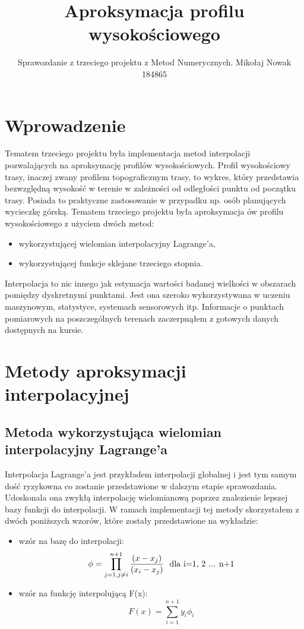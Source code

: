\documentclass{article}
\title{\huge Aproksymacja profilu wysokościowego}
\author{Sprawozdanie z trzeciego projektu z Metod Numerycznych. Mikołaj Nowak 184865}
\date{}
\begin{document}
\maketitle


\section{Wprowadzenie}

Tematem trzeciego projektu była implementacja metod interpolacji pozwalających na aproksymację profilów wysokościowych.
Profil wysokościowy trasy, inaczej zwany profilem topograficznym trasy, to wykres, który przedstawia bezwzględną wysokość w terenie w zależności od odległości punktu od początku trasy. Posiada to praktyczne zastosowanie w przypadku np. osób planujących wycieczkę górską.
Tematem trzeciego projektu była aproksymacja ów profilu wysokościowego z użyciem dwóch metod:
\begin{itemize}
  \item wykorzystującej wielomian interpolacyjny Lagrange'a,
  \item wykorzystującej funkcje sklejane trzeciego stopnia.
\end{itemize}
Interpolacja to nic innego jak estymacja wartości badanej wielkości w obszarach pomiędzy dyskretnymi punktami.
Jest ona szeroko wykorzystywana w uczeniu maszynowym, statystyce, systemach sensorowych itp.
Informacje o punktach pomiarowych na poszczególnych terenach zaczerpnąłem z gotowych danych dostępnych na kursie.

\section{Metody aproksymacji interpolacyjnej}

\subsection{Metoda wykorzystująca wielomian interpolacyjny Lagrange'a}
Interpolacja Lagrange'a jest przykładem interpolacji globalnej i jest tym samym dość ryzykowna co zostanie przedstawione w dalszym
etapie sprawozdania. Udoskonala ona zwykłą interpolację wielomianową poprzez znalezienie lepszej bazy funkcji do interpolacji.
W ramach implementacji tej metody skorzystałem z dwóch poniższych wzorów, które zostały przedstawione na wykładzie:
\begin{itemize}
    \item wzór na bazę do interpolacji:
    \begin{equation}
    \phi = \prod_{j=1, j \neq i}^{n+1} \dfrac{(x-x_j)}{(x_i-x_j)} \text{\space \space dla i=1, 2 ... n+1}
    \end{equation}
    \item wzór na funkcję interpolującą F(x):
    \begin{equation}
    F(x) = \sum_{i=1}^{n+1} y_i \phi_i
    \end{equation}
\end{itemize}
\end{document}
